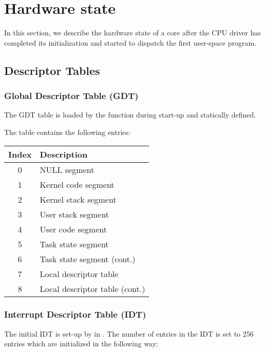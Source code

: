 \documentclass[a4paper,11pt,twoside]{report}
\begin{document}
{{\section{Hardware state}

In this section, we describe the hardware state of a core after the CPU driver
has completed its initialization and started to dispatch the first
user-space program.

\subsection{Descriptor Tables}

\subsubsection{Global Descriptor Table (GDT)}

The GDT table is loaded by the  function during start-up and statically defined.

The table contains the following entries:

\begin{tabular}{c|l}
    Index & Description \\ \hline
    0 & NULL segment  \\
    1 & Kernel code segment  \\
    2 & Kernel stack segment  \\
    3 & User stack segment  \\
    4 & User code segment  \\
    5 & Task state segment  \\
    6 & Task state segment (cont.)  \\
    7 & Local descriptor table \\
    8 & Local descriptor table (cont.) \\
\end{tabular}

\subsubsection{Interrupt Descriptor Table (IDT)}

The initial IDT is set-up by  in
. The number of entries in the IDT is set to 256 entries which
are initialized in the following way:

}}
\end{document}
